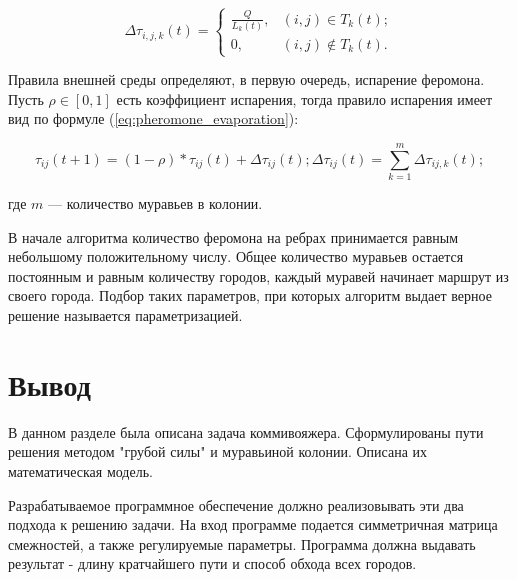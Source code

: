 \begin{equation}
	\label{eq:pheromone_drop}
	\Delta\tau_{i,j,k}(t) =
	\begin{cases}
		\frac{Q}{L_{k}(t)}, & (i,j) \in T_{k}(t);\\
		0, & (i,j) \notin T_{k}(t).
	\end{cases}
\end{equation}

Правила внешней среды определяют, в первую очередь, испарение феромона. Пусть $\rho \in [0,1]$ есть коэффициент испарения, тогда правило испарения имеет вид по формуле (\ref{eq:pheromone_evaporation}):

\begin{equation}
	\label{eq:pheromone_evaporation}
	\tau_{ij}(t+1) = (1 - \rho) * \tau_{ij}(t) + \Delta\tau_{ij}(t); \Delta\tau_{ij}(t) = \sum_{k = 1}^{m} \Delta\tau_{ij,k}(t); 
\end{equation}

где $m$ — количество муравьев в колонии.

В начале алгоритма количество феромона на ребрах принимается равным
небольшому положительному числу. Общее количество муравьев остается постоянным и равным количеству городов, каждый муравей начинает маршрут из своего города.
Подбор таких параметров, при которых алгоритм выдает верное решение называется параметризацией.

\section{Вывод}
В данном разделе была описана задача коммивояжера. Сформулированы пути решения методом "грубой силы" и муравьиной колонии. Описана их математическая модель.

Разрабатываемое программное обеспечение должно реализовывать эти два подхода к решению задачи. На вход программе подается симметричная матрица смежностей, а также регулируемые параметры. Программа должна выдавать результат - длину кратчайшего пути и способ обхода всех городов.